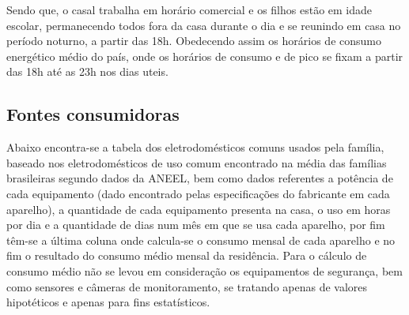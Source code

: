	Sendo que, o casal trabalha em horário comercial e os filhos estão em idade escolar, permanecendo todos fora da casa durante o dia e se reunindo em casa no período noturno, a partir das 18h. Obedecendo assim os horários de consumo energético médio do país, onde os horários de consumo e de pico se fixam a partir das 18h até as 23h nos dias uteis.

\subsection{Fontes consumidoras}

	Abaixo encontra-se a tabela dos eletrodomésticos comuns usados pela família, baseado nos eletrodomésticos de uso comum encontrado na média das famílias brasileiras segundo dados da ANEEL, bem como dados referentes a potência de cada equipamento (dado encontrado pelas especificações do fabricante em cada aparelho), a quantidade de cada equipamento presenta na casa, o uso em horas por dia e a quantidade de dias num mês em que se usa cada aparelho, por fim têm-se a última coluna onde calcula-se o consumo mensal de cada aparelho e no fim o resultado do consumo médio mensal da residência. Para o cálculo de consumo médio não se levou em consideração os equipamentos de segurança, bem como sensores e câmeras de monitoramento, se tratando apenas de valores hipotéticos e apenas para fins estatísticos.



